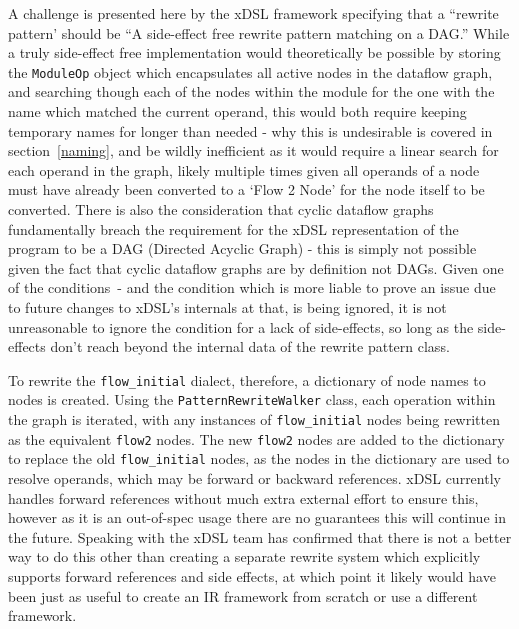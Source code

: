 A challenge is presented here by the xDSL framework specifying that a ``rewrite pattern' should be “A side-effect free rewrite pattern matching on a DAG.'' While a truly side-effect free implementation would theoretically be possible by storing the \lstinline|ModuleOp| object which encapsulates all active nodes in the dataflow graph, and searching though each of the nodes within the module for the one with the name which matched the current operand, this would both require keeping temporary names for longer than needed \hyphen{} why this is undesirable is covered in section \ref{naming}, and be wildly inefficient as it would require a linear search for each operand in the graph, likely multiple times given all operands of a node must have already been converted to a `Flow 2 Node' for the node itself to be converted. There is also the consideration that cyclic dataflow graphs fundamentally breach the requirement for the xDSL representation of the program to be a DAG (Directed Acyclic Graph) \hyphen{} this is simply not possible given the fact that cyclic dataflow graphs are by definition not DAGs. Given one of the conditions \hyphen{} and the condition which is more liable to prove an issue due to future changes to xDSL's internals at that, is being ignored, it is not unreasonable to ignore the condition for a lack of side-effects, so long as the side-effects don't reach beyond the internal data of the rewrite pattern class.

To rewrite the \lstinline|flow_initial| dialect, therefore, a dictionary of node names to nodes is created. Using the \lstinline|PatternRewriteWalker| class, each operation within the graph is iterated, with any instances of \lstinline|flow_initial| nodes being rewritten as the equivalent \lstinline|flow2| nodes. The new \lstinline|flow2| nodes are added to the dictionary to replace the old \lstinline|flow_initial| nodes, as the nodes in the dictionary are used to resolve operands, which may be forward or backward references. xDSL currently handles forward references without much extra external effort to ensure this, however as it is an out-of-spec usage there are no guarantees this will continue in the future. Speaking with the xDSL team has confirmed that there is not a better way to do this other than creating a separate rewrite system which explicitly supports forward references and side effects, at which point it likely would have been just as useful to create an IR framework from scratch or use a different framework.

